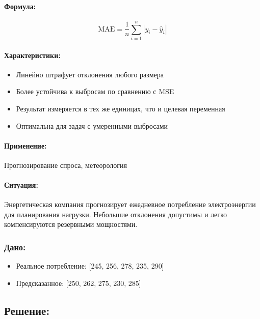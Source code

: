 \paragraph{Формула:}
\begin{equation}
    \text{MAE} = \frac{1}{n} \sum_{i=1}^{n} |y_i - \hat{y}_i|
\end{equation}

\paragraph{Характеристики:}
\begin{itemize}
    \item Линейно штрафует отклонения любого размера
    \item Более устойчива к выбросам по сравнению с MSE
    \item Результат измеряется в тех же единицах, что и целевая переменная
    \item Оптимальна для задач с умеренными выбросами
\end{itemize}

\paragraph{Применение:} Прогнозирование спроса, метеорология

\paragraph{Ситуация:} Энергетическая компания прогнозирует ежедневное потребление электроэнергии для планирования нагрузки. Небольшие отклонения допустимы и легко компенсируются резервными мощностями.

\subsubsection*{Дано:}
\begin{itemize}
    \item Реальное потребление: [245, 256, 278, 235, 290]
    \item Предсказанное: [250, 262, 275, 230, 285]
\end{itemize}

\subsection*{Решение:}

